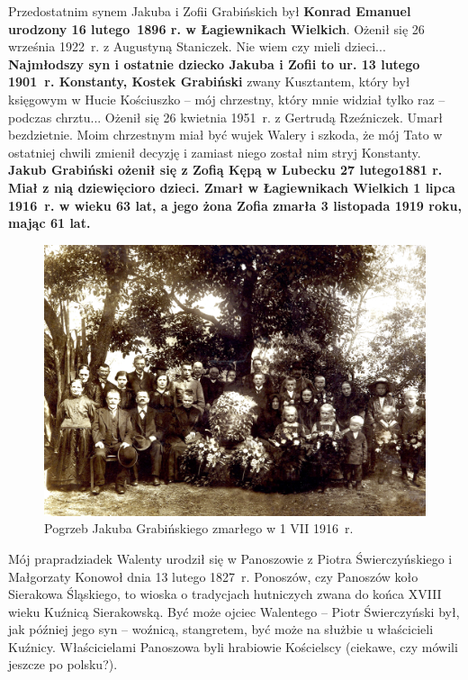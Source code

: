 Przedostatnim synem Jakuba i Zofii Grabińskich był \textbf{Konrad Emanuel urodzony 16 lutego~1896 r. w Łagiewnikach Wielkich}. Ożenił się 26 września 1922~r. z Augustyną Staniczek. Nie wiem czy mieli dzieci... \textbf{Najmłodszy syn i ostatnie dziecko Jakuba i Zofii to ur. 13 lutego 1901~r. Konstanty, Kostek Grabiński} zwany Kusztantem, który był księgowym w Hucie Kościuszko – mój chrzestny, który mnie widział tylko raz – podczas chrztu... Ożenił się 26 kwietnia 1951~r. z Gertrudą Rzeźniczek. Umarł bezdzietnie. Moim chrzestnym miał być wujek Walery i szkoda, że mój Tato w ostatniej chwili zmienił decyzję i zamiast niego został nim stryj Konstanty. \textbf{Jakub Grabiński ożenił się z Zofią Kępą w Lubecku 27 lutego1881 r. Miał z nią dziewięcioro dzieci. Zmarł w Łagiewnikach Wielkich  1 lipca 1916~r. w wieku 63 lat, a jego żona Zofia zmarła 3 listopada 1919 roku, mając 61 lat.}
\begin{figure}[!h]
\begin{center}
\includegraphics[width=\textwidth]{photo/jakub_grabinski_pogrzeb.jpg}
\caption[Pogrzeb Jakuba Grabińskiego]{Pogrzeb Jakuba Grabińskiego zmarłego w 1 VII 1916~r.}
\end{center}
\end{figure}

Mój prapradziadek Walenty urodził się w Panoszowie z Piotra Świerczyńskiego i Małgorzaty Konowoł dnia 13 lutego 1827~r. Ponoszów, czy Panoszów koło Sierakowa Śląskiego, to wioska o tradycjach hutniczych zwana do końca XVIII wieku Kuźnicą Sierakowską. Być może ojciec Walentego – Piotr Świerczyński był, jak później jego syn – woźnicą, stangretem, być może na służbie u właścicieli Kuźnicy. Właścicielami Panoszowa byli hrabiowie Kościelscy (ciekawe, czy mówili jeszcze po polsku?).

